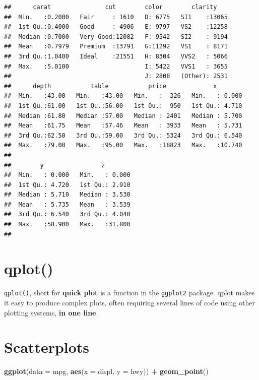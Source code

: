 \documentclass[]{book}
\newenvironment{Shaded}{\begin{snugshade}}{\end{snugshade}}
\newcommand{\DataTypeTok}[1]{\textcolor[rgb]{0.13,0.29,0.53}{#1}}
\newcommand{\KeywordTok}[1]{\textcolor[rgb]{0.13,0.29,0.53}{\textbf{#1}}}
\newcommand{\NormalTok}[1]{#1}
\newcommand{\OperatorTok}[1]{\textcolor[rgb]{0.81,0.36,0.00}{\textbf{#1}}}
\newcommand{\StringTok}[1]{\textcolor[rgb]{0.31,0.60,0.02}{#1}}
\begin{document}
\begin{verbatim}
##      carat               cut        color        clarity     
##  Min.   :0.2000   Fair     : 1610   D: 6775   SI1    :13065  
##  1st Qu.:0.4000   Good     : 4906   E: 9797   VS2    :12258  
##  Median :0.7000   Very Good:12082   F: 9542   SI2    : 9194  
##  Mean   :0.7979   Premium  :13791   G:11292   VS1    : 8171  
##  3rd Qu.:1.0400   Ideal    :21551   H: 8304   VVS2   : 5066  
##  Max.   :5.0100                     I: 5422   VVS1   : 3655  
##                                     J: 2808   (Other): 2531  
##      depth           table           price             x         
##  Min.   :43.00   Min.   :43.00   Min.   :  326   Min.   : 0.000  
##  1st Qu.:61.00   1st Qu.:56.00   1st Qu.:  950   1st Qu.: 4.710  
##  Median :61.80   Median :57.00   Median : 2401   Median : 5.700  
##  Mean   :61.75   Mean   :57.46   Mean   : 3933   Mean   : 5.731  
##  3rd Qu.:62.50   3rd Qu.:59.00   3rd Qu.: 5324   3rd Qu.: 6.540  
##  Max.   :79.00   Max.   :95.00   Max.   :18823   Max.   :10.740  
##                                                                  
##        y                z         
##  Min.   : 0.000   Min.   : 0.000  
##  1st Qu.: 4.720   1st Qu.: 2.910  
##  Median : 5.710   Median : 3.530  
##  Mean   : 5.735   Mean   : 3.539  
##  3rd Qu.: 6.540   3rd Qu.: 4.040  
##  Max.   :58.900   Max.   :31.800  
## 
\end{verbatim}

\hypertarget{qplot}{%
\section{qplot()}\label{qplot}}

\texttt{qplot()}, short for \textbf{quick plot} is a function in the \texttt{ggplot2} package. qplot makes it easy to produce complex plots, often requiring several lines of code using other plotting systems, \textbf{in one line}.

\hypertarget{scatterplots}{%
\section{Scatterplots}\label{scatterplots}}

\begin{Shaded}
\begin{Highlighting}[]
\KeywordTok{ggplot}\NormalTok{(}\DataTypeTok{data =}\NormalTok{ mpg, }\KeywordTok{aes}\NormalTok{(}\DataTypeTok{x =}\NormalTok{ displ, }\DataTypeTok{y =}\NormalTok{ hwy)) }\OperatorTok{+}\StringTok{ }\KeywordTok{geom_point}\NormalTok{()}
\end{Highlighting}
\end{Shaded}
\end{document}

